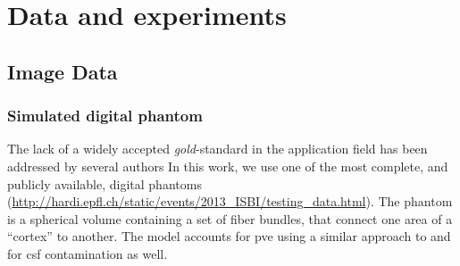 \section{Data and experiments}
\label{sec:experiments}
%


\subsection{Image Data}
\label{sec:datasets}

\subsubsection{Simulated digital phantom} %
%
The lack of a widely accepted \emph{gold}-standard in the application
field has been addressed by several authors \citep{cote_tractometer_2013}
In this work, we use one of the most complete, and publicly available,
digital phantoms (\url{http://hardi.epfl.ch/static/events/2013_ISBI/testing_data.html}).
The phantom is a spherical volume containing a set of fiber bundles, that connect
one area of a ``cortex'' to another. The model accounts for \gls{pve} using
a similar approach to \citep{close_software_2009} and for \gls{csf} contamination
as well.

